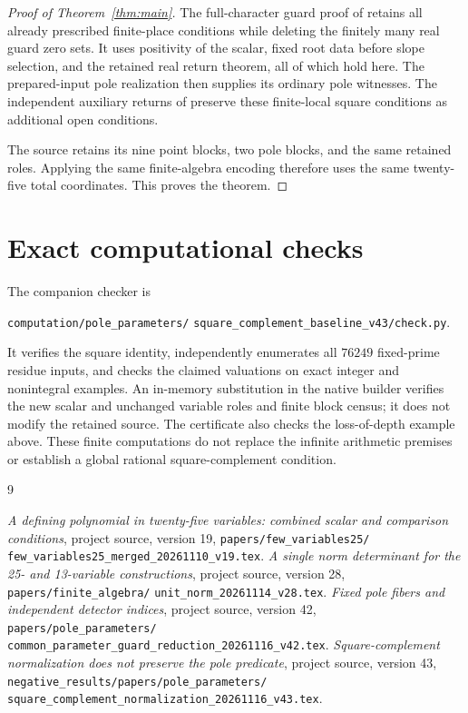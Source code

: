 \documentclass[11pt,a4paper]{article}
\begin{document}
\begin{proof}[Proof of Theorem~\ref{thm:main}]
The full-character guard proof of \cite[Proposition 5.3]{UnitNorm}
retains all already prescribed finite-place conditions while deleting
the finitely many real guard zero sets. It uses positivity of the scalar,
fixed root data before slope selection, and the retained real return
theorem, all of which hold here. The prepared-input pole realization
then supplies its ordinary pole witnesses. The independent auxiliary
returns of \cite[Theorem 3.1]{Returns} preserve these finite-local square
conditions as additional open conditions.

The source retains its nine point blocks, two pole blocks, and the same
retained roles. Applying the same finite-algebra encoding therefore
uses the same twenty-five total coordinates. This proves the theorem.
\end{proof}

\newpage
\section{Exact computational checks}

The companion checker is
\begin{center}\small
\texttt{computation/pole\_parameters/}\allowbreak
\texttt{square\_complement\_baseline\_v43/check.py}.
\end{center}
It verifies the square identity, independently enumerates all $76249$
fixed-prime residue inputs, and checks the claimed valuations on exact
integer and nonintegral examples. An in-memory substitution in the native
builder verifies the new scalar and unchanged variable roles and finite
block census; it does not modify the retained source. The certificate also
checks the loss-of-depth example above. These finite computations do not
replace the infinite arithmetic premises or establish a global rational
square-complement condition.

\begin{thebibliography}{9}
\raggedright
{}
\emph{A defining polynomial in twenty-five variables: combined scalar
and comparison conditions}, project source, version 19,
\texttt{papers/few\_variables25/}\allowbreak
\texttt{few\_variables25\_merged\_20261110\_v19.tex}.
\emph{A single norm determinant for the 25- and 13-variable constructions},
project source, version 28,
\texttt{papers/finite\_algebra/}\allowbreak
\texttt{unit\_norm\_20261114\_v28.tex}.
\emph{Fixed pole fibers and independent detector indices},
project source, version 42,
\texttt{papers/pole\_parameters/}\allowbreak
\texttt{common\_parameter\_guard\_reduction\_20261116\_v42.tex}.
\emph{Square-complement normalization does not preserve the pole predicate},
project source, version 43,
\texttt{negative\_results/papers/pole\_parameters/}\allowbreak
\texttt{square\_complement\_normalization\_20261116\_v43.tex}.
\end{thebibliography}
\end{document}
